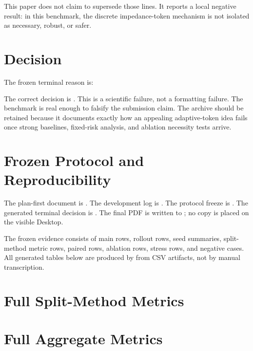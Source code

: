 \documentclass{article}
\begin{document}
This paper does not claim to supersede those lines.
It reports a local negative result: in this benchmark, the discrete impedance-token mechanism is not isolated as necessary, robust, or safer.

\section{Decision}
The frozen terminal reason is:
\begin{quote}\small\raggedright\sloppy
\PaperReason{}\par
\end{quote}
The correct decision is \textbf{\PaperDecision{}}.
This is a scientific failure, not a formatting failure.
The benchmark is real enough to falsify the submission claim.
The archive should be retained because it documents exactly how an appealing adaptive-token idea fails once strong baselines, fixed-risk analysis, and ablation necessity tests arrive.

\clearpage
\appendix
\section{Frozen Protocol and Reproducibility}
The plan-first document is .
The development log is .
The protocol freeze is .
The generated terminal decision is .
The final PDF is written to ; no copy is placed on the visible Desktop.

The frozen evidence consists of \MainRows{} main rows, \RolloutRows{} rollout rows, \SeedRows{} seed summaries, \MetricRows{} split-method metric rows, \PairwiseRows{} paired rows, \AblationRows{} ablation rows, \StressRows{} stress rows, and \NegativeRows{} negative cases.
All generated tables below are produced by  from CSV artifacts, not by manual transcription.

\section{Full Split-Method Metrics}


\section{Full Aggregate Metrics}

\end{document}
